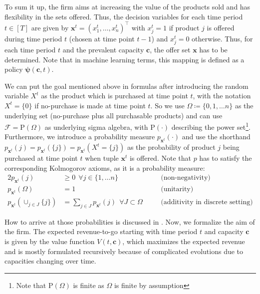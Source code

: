 To sum it up, the firm aims at increasing the value of the products sold and has flexibility in the sets offered. Thus, the decision variables for each time period $t \in [T]$ are given by $\boldsymbol{x}^t = (x^t_1, \dots, x^t_n)^\intercal$ with $x^t_j = 1$ if product $j$ is offered during time period $t$ (\ie chosen at time point $t-1$) and $x^t_j = 0$ otherwise. Thus, for each time period $t$ and the prevalent capacity $\boldsymbol{c}$, the offer set $\boldsymbol{x}$ has to be determined. Note that in machine learning terms, this mapping is defined as a policy $\boldsymbol{\psi}(\boldsymbol{c}, t)$.

We can put the goal mentioned above in formulas after introducing the random variable $X^t$ as the product which is purchased at time point $t$, with the notation $X^t=\{0\}$ if no-purchase is made at time point $t$. 
So we use $\Omega \coloneqq \{0, 1, \dots n\}$ as the underlying set (no-purchase plus all purchasable products) and can use $\mathcal{F} = \text{P}(\Omega)$ as underlying sigma algebra, with $\text{P}(\cdot)$ describing the power set\footnote{Note that $\text{P}(\Omega)$ is finite as $\Omega$ is finite by assumption}. 
Furthermore, we introduce a probability measure $p_{\boldsymbol{x}^t}(\cdot)$ 
and use the shorthand $p_{\boldsymbol{x}^t}(j) = p_{\boldsymbol{x}^t}(\{j\}) = p_{\boldsymbol{x}^t}(X^t = \{j\})$ as the probability of product $j$ being purchased at time point $t$ when tuple $\boldsymbol{x}^t$ is offered. Note that $p$ has to satisfy the corresponding Kolmogorov axioms, as it is a probability measure:
\begin{alignat}{2}
p_{\boldsymbol{x}^t}(j) &\geq 0 ~~\forall j \in \{1, \dots n\} \quad &&\text{(non-negativity)}\\
p_{\boldsymbol{x}^t}(\Omega) &= 1 &&\text{(unitarity)}\\
p_{\boldsymbol{x}^t}(\cup_{j \in J}\{j\}) &= \sum_{j \in J}p_{\boldsymbol{x}^t}(j) ~~\forall J \subset \Omega \quad &&\text{(additivity in discrete setting)}
\end{alignat}

How to arrive at those probabilities is discussed in . Now, we formalize the aim of the firm. The expected revenue-to-go starting with time period $t$ and capacity $\boldsymbol{c}$ is given by the value function $V(t, \boldsymbol{c})$, which maximizes the expected revenue and is mostly formulated recursively because of complicated evolutions due to capacities changing over time.

